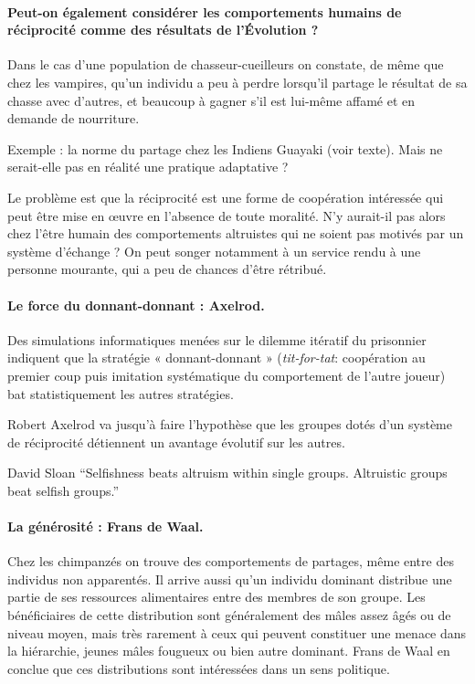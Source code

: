 	\paragraph{Peut-on également considérer les comportements humains de réciprocité comme des résultats de l'Évolution ?}
	Dans le cas d'une population de chasseur-cueilleurs on constate, de même que chez les vampires, qu'un individu a peu à perdre lorsqu'il partage le résultat de sa chasse avec d'autres, et beaucoup à gagner s'il est lui-même affamé et en demande de nourriture.
	
	Exemple : la norme du partage chez les Indiens Guayaki (voir texte).
	Mais ne serait-elle pas en réalité une pratique adaptative ?
	
	Le problème est que la réciprocité est une forme de coopération intéressée qui peut être mise en œuvre en l’absence de toute moralité.
	N'y aurait-il pas alors chez l'être humain des comportements altruistes qui ne soient pas motivés par un système d'échange ?
	On peut songer notamment à un service rendu à une personne mourante, qui a peu de chances d'être rétribué.

	\paragraph{Le force du donnant-donnant : Axelrod.}
	Des simulations informatiques menées sur le dilemme itératif du prisonnier indiquent que la stratégie « donnant-donnant » (\textit{tit-for-tat}: coopération au premier coup puis imitation systématique du comportement de l'autre joueur) bat statistiquement les autres stratégies.

	Robert Axelrod va jusqu'à faire l'hypothèse que les groupes dotés d'un système de réciprocité détiennent un avantage évolutif sur les autres.
	\begin{aquote}{David Sloan }
	“Selfishness beats altruism within single groups.
	Altruistic groups beat selfish groups.”
	\end{aquote}

	\paragraph{La générosité : Frans de Waal.}
	Chez les chimpanzés on trouve des comportements de partages, même entre des individus non apparentés.
	Il arrive aussi qu'un individu dominant distribue une partie de ses ressources alimentaires entre des membres de son groupe.
	Les bénéficiaires de cette distribution sont généralement des mâles assez âgés ou de niveau moyen, mais très rarement à ceux qui peuvent constituer une menace dans la hiérarchie, jeunes mâles fougueux ou bien autre dominant.
	Frans de Waal en conclue que ces distributions sont intéressées dans un sens politique.

